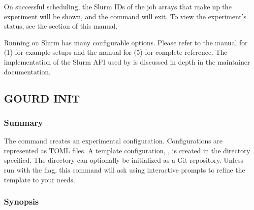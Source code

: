 \documentclass[a4paper,english]{article}
\begin{document}
\begin{adjustwidth}{18pt}{0pt}
\begin{Description}[Subcommands]
                        On successful scheduling, the Slurm IDs of the job arrays that make
                        up the experiment will be shown, and the command will exit.
                        To view the experiment's status, see the   section
                        of this manual.

                        Running on Slurm has many configurable options.
                        Please refer to the manual for (1) for example setups
                        and the manual for (5) for complete reference.
                        The implementation of the Slurm API used by  is discussed
                        in depth in the  maintainer documentation.
                \end{Description}


        \subsection{GOURD INIT}

            \subsubsection{Summary}
                The   command creates an experimental configuration.
                Configurations are represented as TOML files.
                A template configuration, , is created in the directory specified.
                The directory can optionally be initialized as a Git repository.
                Unless run with the  flag, this command will ask using interactive prompts
                to refine the template to your needs.

            \subsubsection{Synopsis}
                 


\end{adjustwidth}
\end{document}
